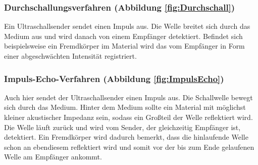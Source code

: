 \subsubsection*{Durchschallungsverfahren (Abbildung \ref{fig:Durchschall})}
Ein Ultraschallsender sendet einen Impuls aus. Die Welle breitet sich durch das Medium aus und wird danach von einem Empfänger detektiert. Befindet sich beispielsweise ein Fremdkörper im Material wird das vom Empfänger in Form einer abgeschwächten Intensität registriert.
\subsubsection*{Impuls-Echo-Verfahren (Abbildung \ref{fig:ImpulsEcho})}
Auch hier sendet der Ultraschallsender einen Impuls aus. Die Schallwelle bewegt sich  
durch das Medium. Hinter dem Medium sollte ein Material mit möglichst kleiner akustischer Impedanz sein, sodass ein Großteil der Welle reflektiert wird. Die Welle läuft zurück und wird vom Sender, der gleichzeitig Empfänger ist, detektiert. Ein Fremdkörper wird dadurch bemerkt, dass die hinlaufende Welle schon an ebendiesem reflektiert wird und somit vor der bis zum Ende gelaufenen Welle am Empfänger ankommt.

